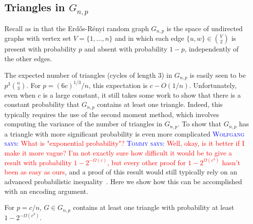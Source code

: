 \documentclass{patmorin}
\newcommand{\aremark}[3]{\textcolor{blue}{\textsc{#1 #2:}}
  \textcolor{red}{\textsf{#3}}}
\newcommand{\tommy}[2][says]{\aremark{Tommy}{#1}{#2}}
\newcommand{\wolfgang}[2][says]{\aremark{Wolfgang}{#1}{#2}}
\begin{document}
\subsection{Triangles in $G_{n,p}$}

Recall as in  that the Erd\H{o}s-R\'{e}nyi random graph
$G_{n,p}$ is the space of undirected graphs with vertex set
$V=\{1,\ldots,n\}$ and in which each edge $\{u, w\} \in \binom{V}{2}$
is present with probability $p$ and absent with probability $1-p$,
independently of the other edges.

The expected number of triangles (cycles of length 3) in $G_{n,p}$ is
easily seen to be $p^3\binom{n}{3}$.  For $p=(6c)^{1/3}/n$, this
expectation is $c-O(1/n)$.  Unfortunately, even when $c$ is a large
constant, it still takes some work to show that there is a constant
probability that $G_{n,p}$ contains at least one triangle. Indeed,
this typically requires the use of the second moment method, which
involves computing the variance of the number of triangles in
$G_{n,p}$. To show that $G_{n, p}$ has a triangle with more
significant probability is even more complicated \wolfgang{What is
  "exponential probability"?} \tommy{Well, okay, is it better if I
  make it more vague? I'm not exactly sure how difficult it would be
  to give a result with probability $1 - 2^{-\varOmega(c)}$, but every
  other proof for $1 - 2^{\varOmega(c^3)}$ hasn't been as easy as
  ours}, and a proof of this result would still typically rely on an
advanced probabilistic inequality~\cite{alon:probabilistic}. Here we
show how this can be accomplished with an encoding argument.

\begin{thm}
  For $p=c/n$, $G \in G_{n,p}$ contains at least one triangle with
  probability at least $1-2^{-\varOmega(c^3)}$.
\end{thm}
\end{document}
